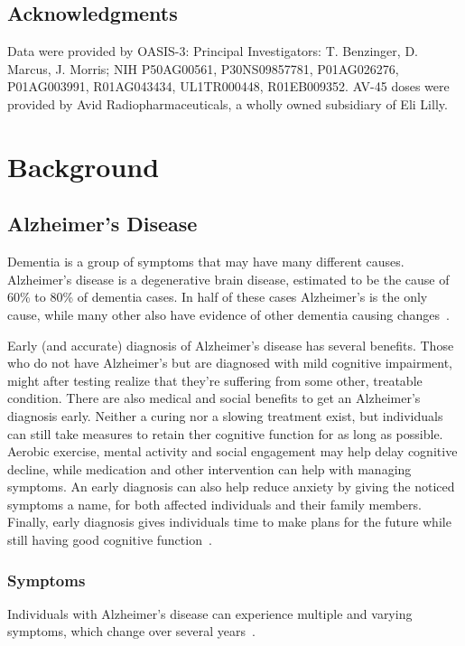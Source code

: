 \documentclass{kththesis}
\begin{document}
\section{Acknowledgments}
Data were provided by OASIS-3: Principal Investigators: T. Benzinger, D. Marcus, J. Morris; NIH P50AG00561, P30NS09857781, P01AG026276, P01AG003991, R01AG043434, UL1TR000448, R01EB009352. AV-45 doses were provided by Avid Radiopharmaceuticals, a wholly owned subsidiary of Eli Lilly.

\chapter{Background}

\section{Alzheimer's Disease}

Dementia is a group of symptoms that may have many different causes. Alzheimer's disease is a degenerative brain disease, estimated to be the cause of 60\% to 80\% of dementia cases. In half of these cases Alzheimer's is the only cause, while many other also have evidence of other dementia causing changes~\cite{factsfigures2018}.

Early (and accurate) diagnosis of Alzheimer's disease has several benefits. Those who do not have Alzheimer's but are diagnosed with mild cognitive impairment, might after testing realize that they're suffering from some other, treatable condition. There are also medical and social benefits to get an Alzheimer's diagnosis early. Neither a curing nor a slowing treatment exist, but individuals can still take measures to retain ther cognitive function for as long as possible. Aerobic exercise, mental activity and social engagement may help delay cognitive decline, while medication and other intervention can help with managing symptoms. An early diagnosis can also help reduce anxiety by giving the noticed symptoms a name, for both affected individuals and their family members. Finally, early diagnosis gives individuals time to make plans for the future while still having good cognitive function~\cite[p. 406-409]{factsfigures2018}.

\subsection{Symptoms}
Individuals with Alzheimer's disease can experience multiple and varying symptoms, which change over several years~\cite{factsfigures2018}.
\end{document}
